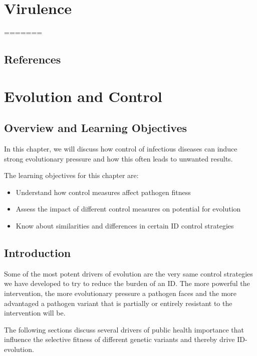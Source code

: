 \documentclass[]{book}
\providecommand{\tightlist}{%
  \setlength{\itemsep}{0pt}\setlength{\parskip}{0pt}}
\theoremstyle{definition}
\theoremstyle{definition}
\theoremstyle{definition}
\theoremstyle{remark}
\begin{document}
\hypertarget{virulence}{%
\chapter{Virulence}\label{virulence}}
=======
\section{References}\label{references-14}

\chapter{Evolution and Control}\label{evolution-and-control}

\section{Overview and Learning
Objectives}\label{overview-and-learning-objectives-14}

In this chapter, we will discuss how control of infectious diseases can
induce strong evolutionary pressure and how this often leads to unwanted
results.

The learning objectives for this chapter are:

\begin{itemize}
\tightlist
\item
  Understand how control measures affect pathogen fitness
\item
  Assess the impact of different control measures on potential for
  evolution
\item
  Know about similarities and differences in certain ID control
  strategies
\end{itemize}

\section{Introduction}\label{introduction-14}

Some of the most potent drivers of evolution are the very same control
strategies we have developed to try to reduce the burden of an ID. The
more powerful the intervention, the more evolutionary pressure a
pathogen faces and the more advantaged a pathogen variant that is
partially or entirely resistant to the intervention will be.

The following sections discuss several drivers of public health
importance that influence the selective fitness of different genetic
variants and thereby drive ID-evolution.
\end{document}
